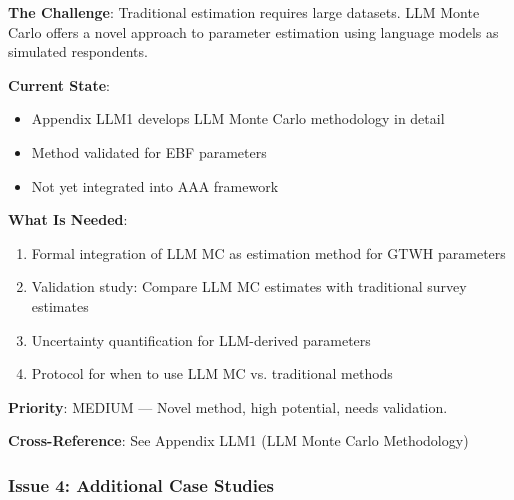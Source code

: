 \begin{tcolorbox}[colback=yellow!5!white, colframe=yellow!75!black, title=Status: Developed Separately]
\textbf{The Challenge}: Traditional estimation requires large datasets. LLM Monte 
Carlo offers a novel approach to parameter estimation using language models as 
simulated respondents.

\textbf{Current State}: 
\begin{itemize}[nosep]
\item Appendix LLM1 develops LLM Monte Carlo methodology in detail
\item Method validated for EBF parameters
\item Not yet integrated into AAA framework
\end{itemize}

\textbf{What Is Needed}:
\begin{enumerate}
\item Formal integration of LLM MC as estimation method for GTWH parameters
\item Validation study: Compare LLM MC estimates with traditional survey estimates
\item Uncertainty quantification for LLM-derived parameters
\item Protocol for when to use LLM MC vs. traditional methods
\end{enumerate}

\textbf{Priority}: \colorbox{yellow!20}{MEDIUM} --- Novel method, high potential, needs validation.

\textbf{Cross-Reference}: See Appendix LLM1 (LLM Monte Carlo Methodology)
\end{tcolorbox}

\subsubsection{Issue 4: Additional Case Studies}

